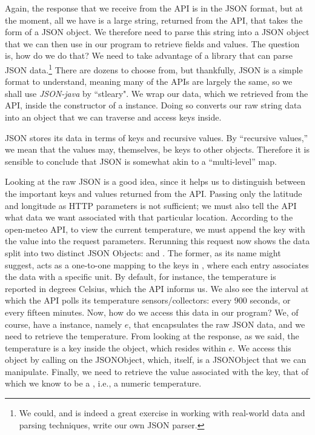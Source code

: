 Again, the response that we receive from the API is in the JSON format, but at the moment, all we have is a large string, returned from the API, that takes the form of a JSON object. We therefore need to parse this string into a JSON object that we can then use in our program to retrieve fields and values. The question is, how do we do that? We need to take advantage of a library that can parse JSON data.\footnote{We could, and is indeed a great exercise in working with real-world data and parsing techniques, write our own JSON parser.} There are dozens to choose from, but thankfully, JSON is a simple format to understand, meaning many of the APIs are largely the same, so we shall use \emph{JSON-java} by ``stleary". We wrap our data, which we retrieved from the API, inside the constructor of a  instance. Doing so converts our raw string data into an object that we can traverse and access keys inside. 

JSON stores its data in terms of keys and recursive values. By ``recursive values,'' we mean that the values may, themselves, be keys to other objects. Therefore it is sensible to conclude that JSON is somewhat akin to a ``multi-level'' map. 

Looking at the raw JSON is a good idea, since it helps us to distinguish between the important keys and values returned from the API. Passing only the latitude and longitude as HTTP parameters is not sufficient; we must also tell the API what data we want associated with that particular location. According to the open-meteo API, to view the current temperature, we must append the  key with the  value into the request parameters. Rerunning this request now shows the data split into two distinct JSON Objects:  and . The former, as its name might suggest, acts as a one-to-one mapping to the keys in , where each entry associates the data with a specific unit. By default, for instance, the temperature is reported in degrees Celsius, which the API informs us. We also see the interval at which the API polls its temperature sensors/collectors: every 900 seconds, or every fifteen minutes. Now, how do we access this data in our program? We, of course, have a  instance, namely $e$, that encapsulates the raw JSON data, and we need to retrieve the temperature. From looking at the response, as we said, the temperature is a key inside the  object, which resides within $e$. We access this object by calling  on the JSONObject, which, itself, is a JSONObject that we can manipulate. Finally, we need to retrieve the value associated with the  key, that of which we know to be a , i.e., a numeric temperature.

